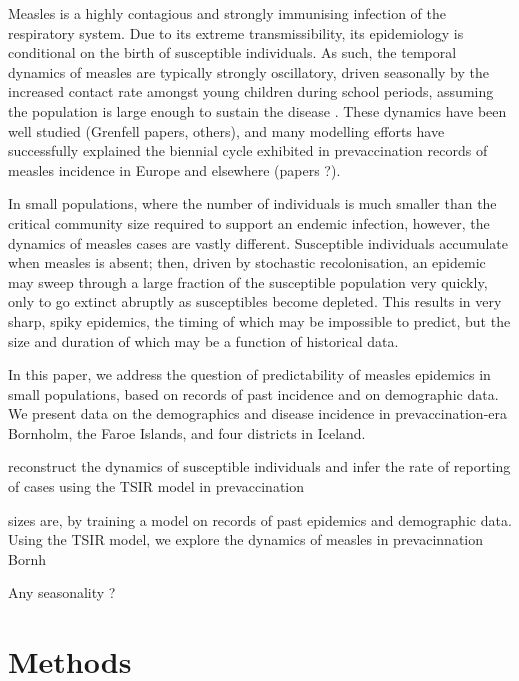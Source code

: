 \documentclass[10pt]{article}
\begin{document}
Measles is a highly contagious and strongly immunising infection of the respiratory system. Due to its extreme transmissibility, its epidemiology is conditional on the birth of susceptible individuals. As such, the temporal dynamics of measles are typically strongly oscillatory, driven seasonally by the increased contact rate amongst young children during school periods, assuming the population is large enough to sustain the disease \cite{Black1966}. These dynamics have been well studied (Grenfell papers, others), and many modelling efforts have successfully explained the biennial cycle exhibited in prevaccination records of measles incidence in Europe and elsewhere (papers ?). 

In small populations, where the number of individuals is much smaller than the critical community size required to support an endemic infection, however, the dynamics of measles cases are vastly different. Susceptible individuals accumulate when measles is absent; then, driven by stochastic recolonisation, an epidemic may sweep through a large fraction of the susceptible population very quickly, only to go extinct abruptly as susceptibles become depleted. This results in very sharp, spiky epidemics, the timing of which may be impossible to predict, but the size and duration of which may be a function of historical data. 

In this paper, we address the question of predictability of measles epidemics in small populations, based on records of past incidence and on demographic data. We present data on the demographics and disease incidence in prevaccination-era Bornholm, the Faroe Islands, and four districts in Iceland. 

reconstruct the dynamics of susceptible individuals and infer the rate of reporting of cases using the TSIR model\cite{Finkenstadt2000} in prevaccination 
 
	

sizes are, by training a model on records of past epidemics and demographic data. Using the TSIR model\cite{Finkenstadt2000}, we explore the dynamics of measles in prevacinnation Bornh


Any seasonality ? 











\section*{Methods}
\end{document}
